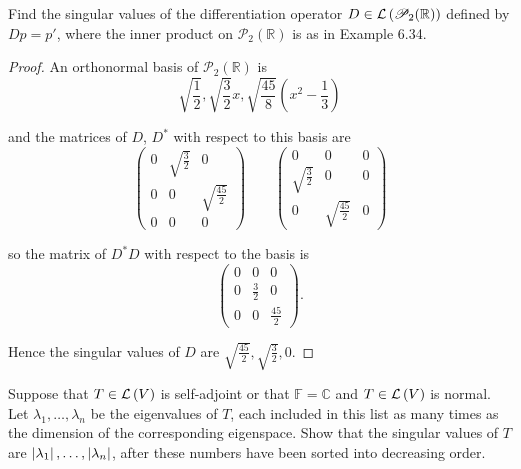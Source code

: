 \begin{exercise}
    Find the singular values of the differentiation operator $D \in \mathcal{L}\left({\mathscr{P}_{2}(\mathbb{R})}\right)$ defined by $Dp = p'$, where the inner product on $\mathscr{P}_{2}(\mathbb{R})$ is as in Example 6.34.
\end{exercise}

\begin{proof}
    An orthonormal basis of $\mathscr{P}_{2}(\mathbb{R})$ is
    \[
        \sqrt{\frac{1}{2}}, \sqrt{\frac{3}{2}}x, \sqrt{\frac{45}{8}}\left(x^{2} - \frac{1}{3}\right)
    \]

    and the matrices of $D$, $D^{*}$ with respect to this basis are
    \[
        \begin{pmatrix}
            0 & \sqrt{\frac{3}{2}} & 0                   \\
            0 & 0                  & \sqrt{\frac{45}{2}} \\
            0 & 0                  & 0
        \end{pmatrix}
        \qquad
        \begin{pmatrix}
            0                  & 0                   & 0 \\
            \sqrt{\frac{3}{2}} & 0                   & 0 \\
            0                  & \sqrt{\frac{45}{2}} & 0
        \end{pmatrix}
    \]

    so the matrix of $D^{*}D$ with respect to the basis is
    \[
        \begin{pmatrix}
            0 & 0           & 0            \\
            0 & \frac{3}{2} & 0            \\
            0 & 0           & \frac{45}{2}
        \end{pmatrix}.
    \]

    Hence the singular values of $D$ are $\sqrt{\frac{45}{2}}, \sqrt{\frac{3}{2}}, 0$.
\end{proof}
\newpage

\begin{exercise}\label{chapter7:sectionE:exercise7}
    Suppose that $T \in \mathcal{L}\left({V}\right)$ is self-adjoint or that $\mathbb{F} = \mathbb{C}$ and $T \in \mathcal{L}\left({V}\right)$ is normal. Let $\lambda_{1}, \ldots, \lambda_{n}$ be the eigenvalues of $T$, each included in this list as many times as the dimension of the corresponding eigenspace. Show that the singular values of $T$ are $\left\vert{\lambda_{1}}\right\vert, \ldots, \left\vert{\lambda_{n}}\right\vert$, after these numbers have been sorted into decreasing order.
\end{exercise}


